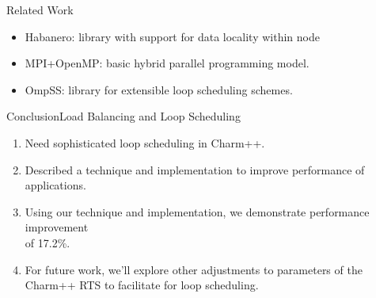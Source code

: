 \begin{frame}{Related Work} 
\begin{itemize}
    \item Habanero\cite{}: library with support for data locality within node 
    \item MPI+OpenMP\cite{}: basic hybrid parallel programming model.
    \item OmpSS\cite{}: library for extensible loop scheduling schemes.
\end{itemize}
\end{frame}


\begin{frame}[label=lsbconcl]{Conclusion}{Load Balancing and Loop Scheduling}
\begin{enumerate}
\tiny \item \tiny Need sophisticated loop scheduling in Charm++. 
\item \tiny Described a technique and implementation to improve performance of applications. 
\item \tiny Using our technique and implementation, we demonstrate performance improvement \\ of 17.2\%.
\item \tiny For future work, we'll explore other adjustments to parameters of the Charm++ RTS to facilitate for loop scheduling. 
\end{enumerate} 

\end{frame}